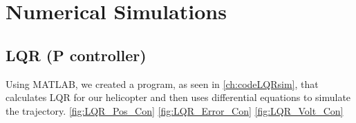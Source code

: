 \chapter{Numerical Simulations}

\section{LQR (P controller)}
Using MATLAB, we created a program, as seen in \ref{ch:codeLQRsim}, that calculates LQR for our helicopter and then uses differential equations to simulate the trajectory. \ref{fig:LQR_Pos_Con} \ref{fig:LQR_Error_Con}  \ref{fig:LQR_Volt_Con}  

